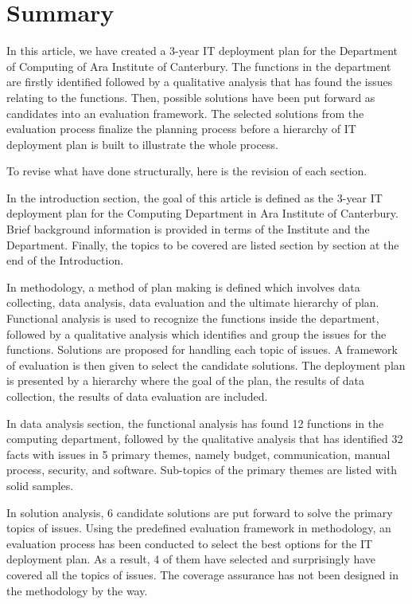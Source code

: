 
\section{Summary}

In this article, we have created a 3-year IT deployment plan for the Department of Computing of Ara Institute of Canterbury. The functions in the department are firstly identified followed by a qualitative analysis that has found the issues relating to the functions. Then, possible solutions have been put forward as candidates into an evaluation framework. The selected solutions from the evaluation process finalize the planning process before a hierarchy of IT deployment plan is built to illustrate the whole process.

To revise what have done structurally, here is the revision of each section.

In the introduction section, the goal of this article is defined as the 3-year IT deployment plan for the Computing Department in Ara Institute of Canterbury. Brief background information is provided in terms of the Institute and the Department. Finally, the topics to be covered are listed section by section at the end of the Introduction.

In methodology, a method of plan making is defined which involves data collecting, data analysis, data evaluation and the ultimate hierarchy of plan. Functional analysis is used to recognize the functions inside the department, followed by a qualitative analysis which identifies and group the issues for the functions. Solutions are proposed for handling each topic of issues. A framework of evaluation is then given to select the candidate solutions. The deployment plan is presented by a hierarchy where the goal of the plan, the results of data collection,  the results of data evaluation are included.

In data analysis section, the functional analysis has found 12 functions in the computing department, followed by the qualitative analysis that has identified 32 facts with issues in 5 primary themes, namely budget, communication, manual process, security, and software. Sub-topics of the primary themes are listed with solid samples.

In solution analysis, 6 candidate solutions are put forward to solve the primary topics of issues. Using the predefined evaluation framework in methodology, an evaluation process has been conducted to select the best options for the IT deployment plan. As a result, 4 of them have selected and surprisingly have covered all the topics of issues. The coverage assurance has not been designed in the methodology by the way.


